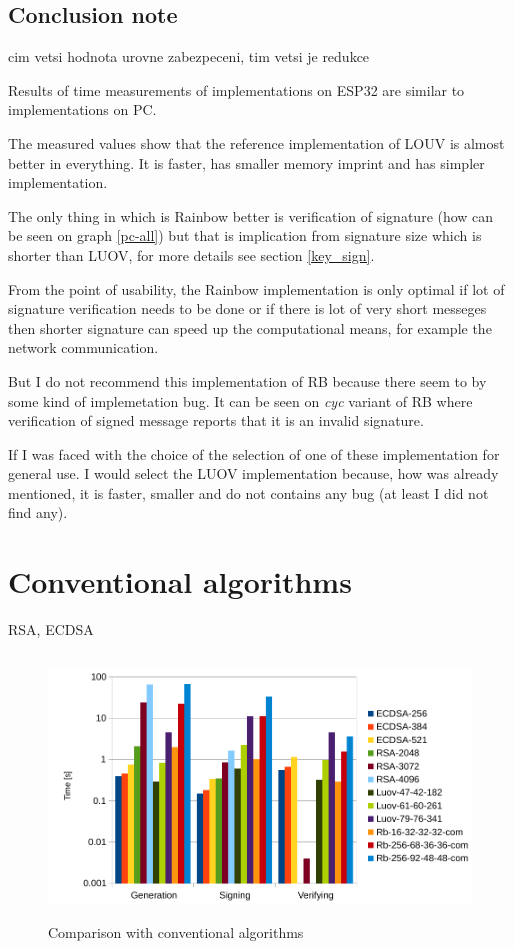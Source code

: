 \documentclass[thesis=M,english]{FITthesis}[2019/12/23]
\begin{document}
\newpage
\subsection{Conclusion note}
cim vetsi hodnota urovne zabezpeceni, tim vetsi je redukce

Results of time measurements of implementations on ESP32 are similar to implementations on PC.

The measured values show that the reference implementation of LOUV is almost better in everything. It is faster, has smaller memory imprint and has simpler implementation.

\bigskip
\noindent
The only thing in which is Rainbow better is verification of signature (how can be seen on graph \ref{pc-all}) but that is implication from signature size which is shorter than LUOV, for more details see section \ref{key_sign}.

\bigskip
\noindent
From the point of usability, the Rainbow implementation is only optimal if lot of signature verification needs to be done or if there is lot of very short messeges then shorter signature can speed up the computational means, for example the network communication.

\bigskip
\noindent
But I do not recommend this implementation of RB because there seem to by some kind of implemetation bug. It can be seen on \textit{cyc} variant of RB where verification of signed message reports that it is an invalid signature.

\bigskip
\noindent
If I was faced with the choice of the selection of one of these implementation for general use. I would select the LUOV implementation because, how was already mentioned, it is faster, smaller and do not contains any bug (at least I did not find any).

\newpage
\section{Conventional algorithms}
RSA, ECDSA

\begin{figure}[H]
\centering
\includegraphics[width=13cm,height=7cm]{images/time-all.pdf}
\caption{Comparison with conventional algorithms}
\label{time-all}
\end{figure}
\end{document}
